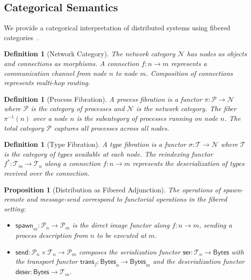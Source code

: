 \documentclass[11pt,a4paper]{article}
\newtheorem{proposition}[theorem]{Proposition}
\newtheorem{definition}[theorem]{Definition}
\newcommand{\catN}{\mathcal{N}}
\newcommand{\catP}{\mathcal{P}}
\newcommand{\catT}{\mathcal{T}}
\newcommand{\spawn}{\mathsf{spawn}}
\newcommand{\sendf}{\mathsf{send}}
\begin{document}
\subsection{Categorical Semantics}

We provide a categorical interpretation of distributed systems using
fibered categories~\citep{jacobs1999categorical}.

\begin{definition}[Network Category]
The \emph{network category} $\catN$ has nodes as objects and
connections as morphisms. A connection $f : n \to m$ represents a
communication channel from node $n$ to node $m$. Composition of
connections represents multi-hop routing.
\end{definition}

\begin{definition}[Process Fibration]
A \emph{process fibration} is a functor $\pi : \catP \to \catN$ where
$\catP$ is the category of processes and $\catN$ is the network category.
The fiber $\pi^{-1}(n)$ over a node $n$ is the subcategory of processes
running on node $n$. The total category $\catP$ captures all processes
across all nodes.
\end{definition}

\begin{definition}[Type Fibration]
A \emph{type fibration} is a functor $\sigma : \catT \to \catN$ where
$\catT$ is the category of types available at each node. The reindexing
functor $f^* : \catT_m \to \catT_n$ along a connection $f : n \to m$
represents the deserialization of types received over the connection.
\end{definition}

\begin{proposition}[Distribution as Fibered Adjunction]
\label{prop:fibered}
The operations of spawn-remote and message-send correspond to
functorial operations in the fibered setting:
\begin{itemize}[nosep]
  \item $\spawn_m : \catP_n \to \catP_m$ is the direct image functor
        along $f : n \to m$, sending a process description from $n$ to
        be executed at $m$.
  \item $\sendf : \catP_n \times \catT_n \to \catP_m$ composes the
        serialization functor $\mathsf{ser} : \catT_n \to \mathsf{Bytes}$
        with the transport functor $\mathsf{trans}_{f} :
        \mathsf{Bytes}_n \to \mathsf{Bytes}_m$ and the deserialization
        functor $\mathsf{deser} : \mathsf{Bytes} \to \catT_m$.
\end{itemize}
\end{proposition}
\end{document}
